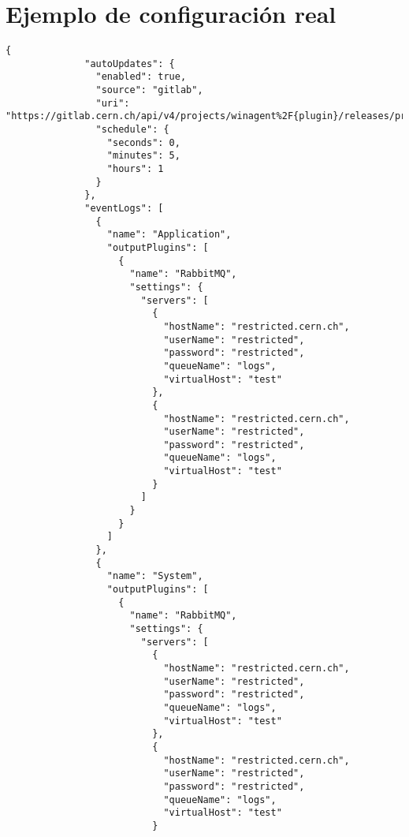     
    \section{Ejemplo de configuración real}\label{anx:settings}
        \begin{lstlisting}[style=csharp, caption=Fichero de configuración]
            {
              "autoUpdates": {
                "enabled": true,
                "source": "gitlab",
                "uri": "https://gitlab.cern.ch/api/v4/projects/winagent%2F{plugin}/releases/production",
                "schedule": {
                  "seconds": 0,
                  "minutes": 5,
                  "hours": 1
                }
              },
              "eventLogs": [
                {
                  "name": "Application",
                  "outputPlugins": [
                    {
                      "name": "RabbitMQ",
                      "settings": {
                        "servers": [
                          {
                            "hostName": "restricted.cern.ch",
                            "userName": "restricted",
                            "password": "restricted",
                            "queueName": "logs",
                            "virtualHost": "test"
                          },
                          {
                            "hostName": "restricted.cern.ch",
                            "userName": "restricted",
                            "password": "restricted",
                            "queueName": "logs",
                            "virtualHost": "test"
                          }
                        ]
                      }
                    }
                  ]
                },
                {
                  "name": "System",
                  "outputPlugins": [
                    {
                      "name": "RabbitMQ",
                      "settings": {
                        "servers": [
                          {
                            "hostName": "restricted.cern.ch",
                            "userName": "restricted",
                            "password": "restricted",
                            "queueName": "logs",
                            "virtualHost": "test"
                          },
                          {
                            "hostName": "restricted.cern.ch",
                            "userName": "restricted",
                            "password": "restricted",
                            "queueName": "logs",
                            "virtualHost": "test"
                          }

\end{lstlisting}
